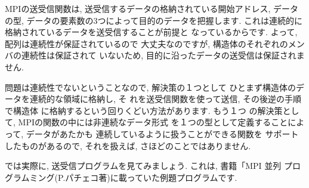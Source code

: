\documentclass[a4paper,titlepage]{jreport}
\begin{document}
MPIの送受信関数は, 送受信するデータの格納されている開始アドレス,
データの型, データの要素数の3つによって目的のデータを把握します.
これは連続的に格納されているデータを送受信することが前提と
なっているからです. よって, 配列は連続性が保証されているので
大丈夫なのですが, 構造体のそれぞれのメンバの連続性は保証されて
いないため, 目的に沿ったデータの送受信は保証されません.

問題は連続性でないということなので, 解決策の１つとして
ひとまず構造体のデータを連続的な領域に格納し, そ
れを送受信関数を使って送信, その後逆の手順で構造体
に格納するという回りくどい方法があります. もう１つ
の解決策として, MPIの関数の中には非連続なデータ形式
を１つの型として定義することによって, データがあたかも
連続しているように扱うことができる関数を
サポートしたものがあるので, それを扱えば, さほどのことではありません.

では実際に, 送受信プログラムを見てみましょう. これは, 書籍「MPI 並列
プログラムミング(P.パチェコ著)に載っていた例題プログラムです.
\end{document}
